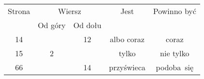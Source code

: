\documentclass[a4paper,11pt]{article}
\begin{document}
\begin{center}

  \begin{tabular}{|c|c|c|c|c|}
    \hline
    Strona & \multicolumn{2}{c|}{Wiersz} & Jest
                              & Powinno być \\ \cline{2-3}
    & Od góry & Od dołu & & \\
    \hline
    14  & & 12 & albo coraz & coraz \\
    15  &  2 & & tylko & nie tylko \\
    66  & & 14 & przyświeca & podoba~się \\
    \hline
  \end{tabular}






\end{center}
\end{document}
